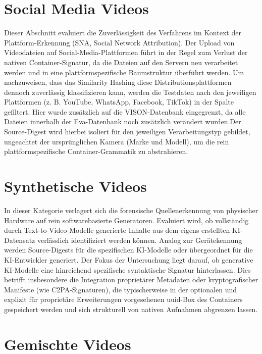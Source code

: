 
\section{Social Media Videos}

Dieser Abschnitt evaluiert die Zuverlässigkeit des Verfahrens im Kontext der Plattform-Erkennung (SNA, Social Network Attribution). Der Upload von Videodateien auf Social-Media-Plattformen führt in der Regel zum Verlust der nativen Container-Signatur, da die Dateien auf den Servern neu verarbeitet werden und in eine plattformspezifische Baumstruktur überführt werden. Um nachzuweisen, dass das Similarity Hashing diese Distributionsplattformen dennoch zuverlässig klassifizieren kann, werden die Testdaten nach den jeweiligen Plattformen (z. B. YouTube, WhatsApp, Facebook, TikTok) in der Spalte gefiltert. Hier wurde zusätzlich auf die VISON-Datenbank eingegrenzt, da alle Dateien innerhalb der Eva-Datenbank noch zusätzlich verändert wurden.Der Source-Digest wird hierbei isoliert für den jeweiligen Verarbeitungstyp gebildet, ungeachtet der ursprünglichen Kamera (Marke und Modell), um die rein plattformspezifische Container-Grammatik zu abstrahieren.


\section{Synthetische Videos}

In dieser Kategorie verlagert sich die forensische Quellenerkennung von physischer Hardware auf rein softwarebasierte Generatoren. Evaluiert wird, ob vollständig durch Text-to-Video-Modelle generierte Inhalte aus dem eigens erstellten KI-Datensatz verlässlich identifiziert werden können. Analog zur Gerätekennung werden Source-Digests für die spezifischen KI-Modelle oder übergeordnet für die KI-Entwickler generiert. Der Fokus der Untersuchung liegt darauf, ob generative KI-Modelle eine hinreichend spezifische syntaktische Signatur hinterlassen. Dies betrifft insbesondere die Integration proprietärer Metadaten oder kryptografischer Manifeste (wie C2PA-Signaturen), die typischerweise in der optionalen und explizit für proprietäre Erweiterungen vorgesehenen uuid-Box des Containers gespeichert werden und sich strukturell von nativen Aufnahmen abgrenzen lassen.


\section{Gemischte Videos}

